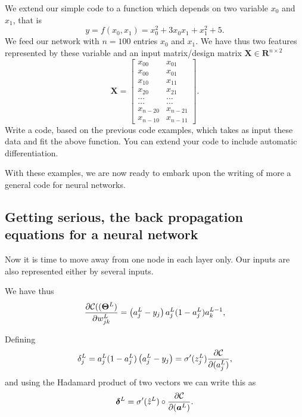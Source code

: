 \documentclass[%
oneside,                 %
final,                   %
10pt]{article}
\newenvironment{doconceexercise}{}{}
\newcounter{doconceexercisecounter}
\begin{document}
\begin{doconceexercise}

                             

We extend our simple code to a function which depends on two variable $x_0$ and $x_1$, that is
\[
y=f(x_0,x_1)=x_0^2+3x_0x_1+x_1^2+5.
\]
We feed our network with $n=100$ entries $x_0$ and $x_1$. We have thus two features represented by these variable and an input matrix/design matrix $\bm{X}\in \mathbf{R}^{n\times 2}$
\[
\bm{X}=\begin{bmatrix} x_{00} & x_{01} \\ x_{00} & x_{01} \\ x_{10} & x_{11} \\ x_{20} & x_{21} \\ \dots & \dots \\ \dots & \dots \\ x_{n-20} & x_{n-21} \\ x_{n-10} & x_{n-11} \end{bmatrix}.
\]
Write a code, based on the previous code examples, which takes as input these data and fit the above function.
You can extend your code to include automatic differentiation.

With these examples, we are now ready to embark upon the writing of more a general code for neural networks.

\end{doconceexercise}

\subsection{Getting serious, the  back propagation equations for a neural network}

Now it is time to move away from one node in each layer only. Our inputs are also represented either by several inputs.

We have thus
\[
\frac{\partial{\cal C}((\bm{\Theta}^L)}{\partial w_{jk}^L}  =  \left(a_j^L - y_j\right)a_j^L(1-a_j^L)a_k^{L-1}, 
\]

Defining
\[
\delta_j^L = a_j^L(1-a_j^L)\left(a_j^L - y_j\right) = \sigma'(z_j^L)\frac{\partial {\cal C}}{\partial (a_j^L)},
\]
and using the Hadamard product of two vectors we can write this as
\[
\bm{\delta}^L = \sigma'(\hat{z}^L)\circ\frac{\partial {\cal C}}{\partial (\bm{a}^L)}.
\]
\end{document}
